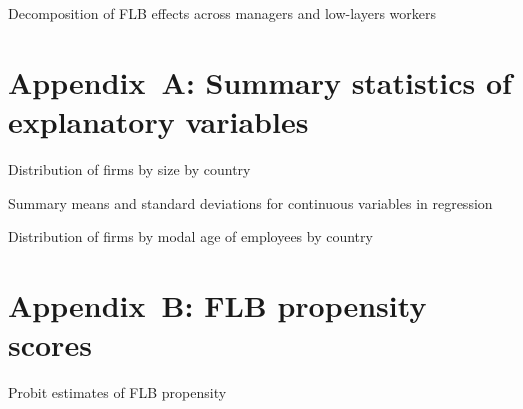 \documentclass[12pt]{article}
\begin{document}
\clearpage

\begin{landscape}
\centering
\begin{table}[htb]
\caption{Decomposition of FLB effects across managers and low-layers workers}
\label{tab:disp_avg_man_ls}

\end{table}
\end{landscape}



\clearpage
\section*{Appendix~A: Summary statistics of explanatory variables}

\begin{table}[ht]
\centering
\small
\label{tab:sum_reg_var_size}
\caption{Distribution of firms by size by country}

\end{table}

\begin{table}[htp]
\label{tab:sum_reg_var_cont}
\caption{Summary means and standard deviations for continuous variables in regression}
\centering
\small

\end{table}

\begin{table}[ht]
\label{tab:sum_reg_var_mod_age}
\caption{Distribution of firms by modal age of employees by country}
\centering
\small

\end{table}


\clearpage
\section*{Appendix~B: FLB propensity scores}

\begin{table}[thb]
\caption{Probit estimates of FLB propensity}
\label{tab:propensity}

\end{table}
\end{document}
